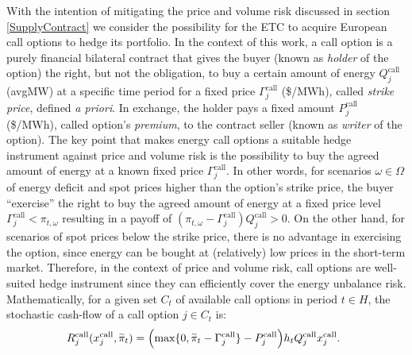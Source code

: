 	With the intention of mitigating the price and volume risk discussed in section \ref{SupplyContract} we consider the possibility for the ETC to acquire European call options to hedge its portfolio. In the context of this work, a call option is a purely financial bilateral contract that gives the buyer (known as \textit{holder} of the option) the right, but not the obligation, to buy a certain amount of energy $Q_{j}^{\text{call}}$ (avgMW) at a specific time period for a fixed price $\Gamma_{j}^{\text{call}}$ (\$/MWh), called \textit{strike price}, defined \textit{a priori}. In exchange, the holder pays a fixed amount $P_{j}^{\text{call}}$ (\$/MWh), called option's \textit{premium}, to the contract seller (known as \textit{writer} of the option). The key point that makes energy call options a suitable hedge instrument against price and volume risk is the possibility to buy the agreed amount of energy at a known fixed price $\Gamma_{j}^{\text{call}}$. In other words, for scenarios $\omega \in \Omega$ of energy deficit and spot prices higher than the option's strike price, the buyer ``exercise'' the right to buy the agreed amount of energy at a fixed price level $\Gamma_{j}^{\text{call}} < \pi_{t,\omega}$ resulting in a payoff of $(\pi_{t,\omega} - \Gamma_{j}^{\text{call}})Q_{j}^{\text{call}} > 0$. On the other hand, for scenarios of spot prices below the strike price, there is no advantage in exercising the option, since energy can be bought at (relatively) low prices in the short-term market. Therefore, in the context of price and volume risk, call options are well-suited hedge instrument since they can efficiently cover the energy unbalance risk. Mathematically, for a given set $C_{t}$ of available call options in period $t \in H$, the stochastic cash-flow of a call option $j \in C_{t}$ is:
%
\begin{align}
	\hspace{-0.20cm} R_{j}^{\text{call}}(x_{j}^{\text{call}}, \accentset{\sim}{\pi}_{t}) = \Big( \text{max}\{0, \accentset{\sim}{\pi}_{t} - \Gamma_{j}^{\text{call}}\} - P_{j}^{\text{call}} \Big) h_{t} Q_{j}^{\text{call}} x_{j}^{\text{call}}. \label{CallCashFlow}
\end{align}

